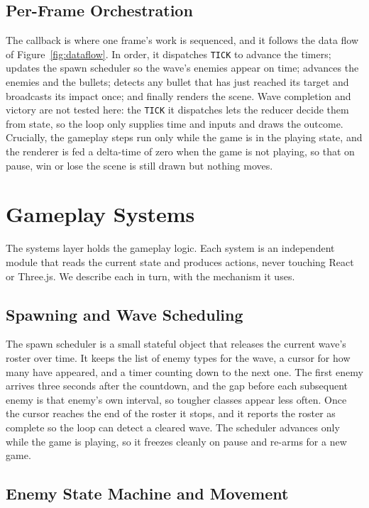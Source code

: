\documentclass[12pt,a4paper]{report}
\begin{document}
\subsection{Per-Frame Orchestration}

The callback is where one frame's work is sequenced, and it follows the data
flow of Figure~\ref{fig:dataflow}. In order, it dispatches \texttt{TICK} to
advance the timers; updates the spawn scheduler so the wave's enemies appear on
time; advances the enemies and the bullets; detects any bullet that has just
reached its target and broadcasts its impact once; and finally renders the scene.
Wave completion and victory are not tested here: the \texttt{TICK} it dispatches
lets the reducer decide them from state, so the loop only supplies time and inputs
and draws the outcome. Crucially, the gameplay steps run only
while the game is in the playing state, and the renderer is fed a delta-time of
zero when the game is not playing, so that on pause, win or lose the scene is
still drawn but nothing moves.

\section{Gameplay Systems}

The systems layer holds the gameplay logic. Each system is an independent module
that reads the current state and produces actions, never touching React or
Three.js. We describe each in turn, with the mechanism it uses.

\subsection{Spawning and Wave Scheduling}

The spawn scheduler is a small stateful object that releases the current wave's
roster over time. It keeps the list of enemy types for the wave, a cursor for how
many have appeared, and a timer counting down to the next one. The first enemy
arrives three seconds after the countdown, and the gap before each subsequent
enemy is that enemy's own interval, so tougher classes appear less often. Once
the cursor reaches the end of the roster it stops, and it reports the roster as
complete so the loop can detect a cleared wave. The scheduler advances only while
the game is playing, so it freezes cleanly on pause and re-arms for a new game.

\subsection{Enemy State Machine and Movement}
\end{document}
